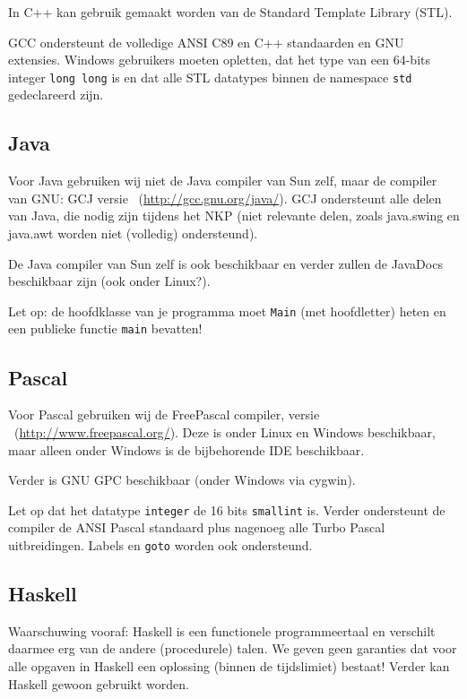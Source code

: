 \documentclass[11pt,titlepage,a4paper]{article}
\begin{document}
In C++ kan gebruik gemaakt worden van de Standard Template Library
(STL).

GCC ondersteunt de volledige ANSI C89 en C++ standaarden en GNU
extensies. Windows gebruikers moeten opletten, dat het type van een
64-bits integer \texttt{long long} is en dat alle STL datatypes binnen de
namespace \texttt{std} gedeclareerd zijn.

\subsection{Java}

Voor Java gebruiken wij niet de Java compiler van Sun zelf, maar de
compiler van GNU: GCJ versie \LINUXGCJ\
(\url{http://gcc.gnu.org/java/}). GCJ ondersteunt
alle delen van Java, die nodig zijn tijdens het NKP (niet relevante
delen, zoals java.swing en java.awt worden niet (volledig)
ondersteund).

De Java compiler van Sun zelf is ook beschikbaar en verder zullen de
JavaDocs beschikbaar zijn (ook onder Linux?).

Let op: de hoofdklasse van je programma moet \texttt{Main} (met
hoofdletter) heten en een publieke functie \texttt{main} bevatten!

\subsection{Pascal}

Voor Pascal gebruiken wij de FreePascal compiler, versie
\LINUXFPC\ (\url{http://www.freepascal.org/}). Deze is onder
Linux en Windows beschikbaar, maar alleen onder Windows is de
bijbehorende IDE beschikbaar.

Verder is GNU GPC beschikbaar (onder Windows via cygwin).

Let op dat het datatype \texttt{integer} de 16 bits \texttt{smallint}
is. Verder ondersteunt de compiler de ANSI Pascal standaard plus
nagenoeg alle Turbo Pascal uitbreidingen. Labels en \texttt{goto}
worden ook ondersteund.

\subsection{Haskell}

Waarschuwing vooraf: Haskell is een functionele programmeertaal en
verschilt daarmee erg van de andere (procedurele) talen. We geven geen
garanties dat voor alle opgaven in Haskell een oplossing (binnen de
tijdslimiet) bestaat! Verder kan Haskell gewoon gebruikt worden.
\end{document}
